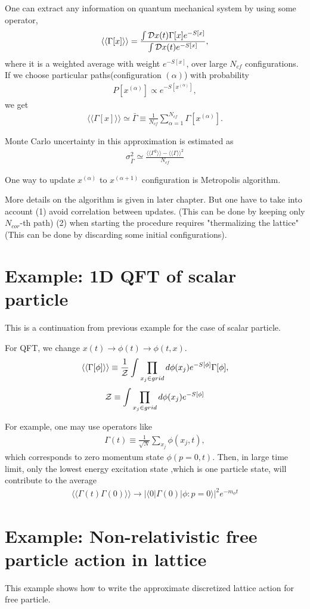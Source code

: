 \documentclass[10pt]{book}
\newcommand{\bea}{\begin{eqnarray}}
\newcommand{\eea}{\end{eqnarray}}
\def\la{\langle}
\def\ra{\rangle}
\begin{document}
One can extract any information on quantum mechanical
system by using some operator,
\bea 
\la \la \Gamma[x]\ra\ra = \frac{\int {\cal D}x(t) \Gamma[x] e^{-S[x]}}{\int {\cal D}x(t)e^{-S[x]}  },
\eea 
where it is a weighted average with weight $e^{-S[x]}$, over large $N_{cf}$ configurations.
If we choose particular paths(configuration $(\alpha)$) with probability 
\bea 
P[x^{(\alpha)}]\propto e^{-S[x^{(\alpha)}]},
\eea 
we get 
\bea 
\la \la \Gamma[x]\ra\ra\simeq \bar{\Gamma}\equiv \frac{1}{N_{cf}}\sum_{\alpha=1}^{N_{cf}} \Gamma[x^{(\alpha)}].
\eea 

Monte Carlo uncertainty in this approximation is estimated as
\bea 
\sigma^2_{\bar{\Gamma}}\simeq \frac{\la\la \Gamma^2\ra \ra -\la\la\Gamma\ra\ra^2}{N_{cf}}
\eea 

One way to update $x^{(\alpha)}$ to $x^{(\alpha+1)}$ configuration is Metropolis algorithm. 

More details on the algorithm is given in later chapter. 
But one have to take into account (1) avoid correlation between updates. (This can be done by keeping only $N_{cor}$-th path) (2) when starting the procedure requires "thermalizing the lattice"(This can be done
by discarding some initial configurations). 

\section{Example: 1D QFT of scalar particle}
{\color{blue} This is a continuation from previous example for the case of scalar particle.} 
	

For QFT, we change $x(t)\to \phi(t)\to \phi(t,x)$.
\bea 
\la\la \Gamma[\phi]\ra\ra \equiv \frac{1}{\cal Z}\int \prod_{x_j\in grid}d\phi(x_j) e^{-S[\phi]}\Gamma[\phi], 
\eea 
\bea 
{\cal Z}\equiv \int \prod_{x_j\in grid}d\phi(x_j) e^{-S[\phi]}
\eea 

For example, one may use operators like
\bea 
\Gamma(t)\equiv \frac{1}{\sqrt{N}}\sum_{x_j}\phi(x_j,t),
\eea 
which corresponds to zero momentum state $\phi(p=0,t)$. Then, in large time limit, 
only the lowest energy excitation state ,which is one particle state, 
will contribute to the average  
\bea 
\la \la \Gamma(t)\Gamma(0)\ra\ra \to |\la 0|\Gamma(0)|\phi: p=0\ra |^2 e^{-m_\phi t}
\eea 


\section{Example: Non-relativistic free particle action in lattice}
{\color{blue} This example shows how to write the approximate discretized lattice action for free particle.
}
\end{document}
